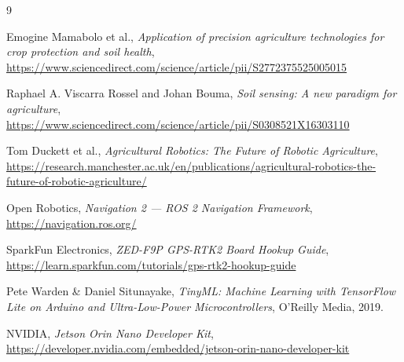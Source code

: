 \documentclass [12pt, a4paper]{article}
\begin{document}


\renewcommand{\contentsname}{\centering Sommaire}
\tableofcontents
\thispagestyle{empty}
\setcounter{page}{0}

\newpage







\newpage
\begin{thebibliography}{9}

  Emogine Mamabolo et al., \emph{Application of precision agriculture technologies for crop protection and soil health},
  \url{https://www.sciencedirect.com/science/article/pii/S2772375525005015}

  Raphael A. Viscarra Rossel and Johan Bouma, \emph{Soil sensing: A new paradigm for agriculture},
  \url{https://www.sciencedirect.com/science/article/pii/S0308521X16303110}

  Tom Duckett et al., \emph{Agricultural Robotics: The Future of Robotic Agriculture},
  \url{https://research.manchester.ac.uk/en/publications/agricultural-robotics-the-future-of-robotic-agriculture/}

  Open Robotics, \emph{Navigation 2 — ROS 2 Navigation Framework},
  \url{https://navigation.ros.org/}

  SparkFun Electronics, \emph{ZED-F9P GPS-RTK2 Board Hookup Guide},
  \url{https://learn.sparkfun.com/tutorials/gps-rtk2-hookup-guide}

  Pete Warden \& Daniel Situnayake, \emph{TinyML: Machine Learning with TensorFlow Lite on Arduino and Ultra-Low-Power Microcontrollers}, O'Reilly Media, 2019.

  NVIDIA, \emph{Jetson Orin Nano Developer Kit},
  \url{https://developer.nvidia.com/embedded/jetson-orin-nano-developer-kit}

\end{thebibliography}
\end{document}
